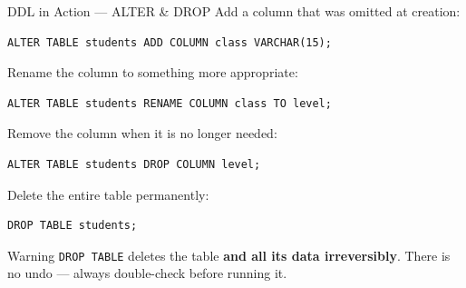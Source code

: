 \begin{frame}[fragile]{DDL in Action — ALTER \& DROP}
  Add a column that was omitted at creation:
\begin{lstlisting}[style=sql]
ALTER TABLE students ADD COLUMN class VARCHAR(15);
\end{lstlisting}

  Rename the column to something more appropriate:
\begin{lstlisting}[style=sql]
ALTER TABLE students RENAME COLUMN class TO level;
\end{lstlisting}

  Remove the column when it is no longer needed:
\begin{lstlisting}[style=sql]
ALTER TABLE students DROP COLUMN level;
\end{lstlisting}

  Delete the entire table permanently:
\begin{lstlisting}[style=sql]
DROP TABLE students;
\end{lstlisting}

  \begin{alertblock}{\faExclamationTriangle\; Warning}
    \texttt{DROP TABLE} deletes the table \textbf{and all its data irreversibly}. There is no undo — always double-check before running it.
  \end{alertblock}
\end{frame}